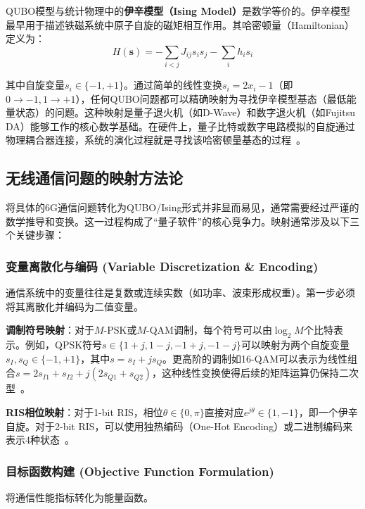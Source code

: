 \documentclass[12pt,a4paper]{article}
\newcommand{\bs}{\mathbf{s}}
\begin{document}
QUBO模型与统计物理中的\textbf{伊辛模型（Ising Model）}是数学等价的。伊辛模型最早用于描述铁磁系统中原子自旋的磁矩相互作用。其哈密顿量（Hamiltonian）定义为：
\begin{equation}
H(\bs) = -\sum_{i<j} J_{ij} s_i s_j - \sum_{i} h_i s_i
\label{eq:ising}
\end{equation}

其中自旋变量$s_i \in \{-1, +1\}$。通过简单的线性变换$s_i = 2x_i - 1$（即$0 \to -1, 1 \to +1$），任何QUBO问题都可以精确映射为寻找伊辛模型基态（最低能量状态）的问题。这种映射是量子退火机（如D-Wave）和数字退火机（如Fujitsu DA）能够工作的核心数学基础。在硬件上，量子比特或数字电路模拟的自旋通过物理耦合器连接，系统的演化过程就是寻找该哈密顿量基态的过程~\cite{ref5}。

\subsection{无线通信问题的映射方法论}

将具体的6G通信问题转化为QUBO/Ising形式并非显而易见，通常需要经过严谨的数学推导和变换。这一过程构成了``量子软件''的核心竞争力。映射通常涉及以下三个关键步骤：

\subsubsection{变量离散化与编码 (Variable Discretization \& Encoding)}

通信系统中的变量往往是复数或连续实数（如功率、波束形成权重）。第一步必须将其离散化并编码为二值变量。

\textbf{调制符号映射}：对于$M$-PSK或$M$-QAM调制，每个符号可以由$\log_2 M$个比特表示。例如，QPSK符号$s \in \{1+j, 1-j, -1+j, -1-j\}$可以映射为两个自旋变量$s_I, s_Q \in \{-1, +1\}$，其中$s = s_I + j s_Q$。更高阶的调制如16-QAM可以表示为线性组合$s = 2s_{I1} + s_{I2} + j(2s_{Q1} + s_{Q2})$，这种线性变换使得后续的矩阵运算仍保持二次型~\cite{ref5}。

\textbf{RIS相位映射}：对于1-bit RIS，相位$\theta \in \{0, \pi\}$直接对应$e^{j\theta} \in \{1, -1\}$，即一个伊辛自旋。对于2-bit RIS，可以使用独热编码（One-Hot Encoding）或二进制编码来表示4种状态~\cite{ref18}。

\subsubsection{目标函数构建 (Objective Function Formulation)}

将通信性能指标转化为能量函数。
\end{document}
